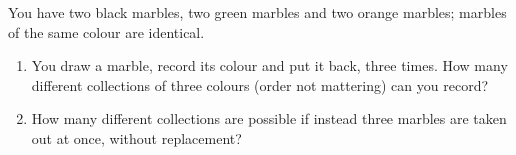 You have two black marbles, two green marbles and two orange marbles; marbles of the same colour are identical.
\begin{enumerate}
\item[(a)] You draw a marble, record its colour and put it back, three times. How many different collections of three colours (order not mattering) can you record?
\item[(b)] How many different collections are possible if instead three marbles are taken out at once, without replacement?
\end{enumerate}
